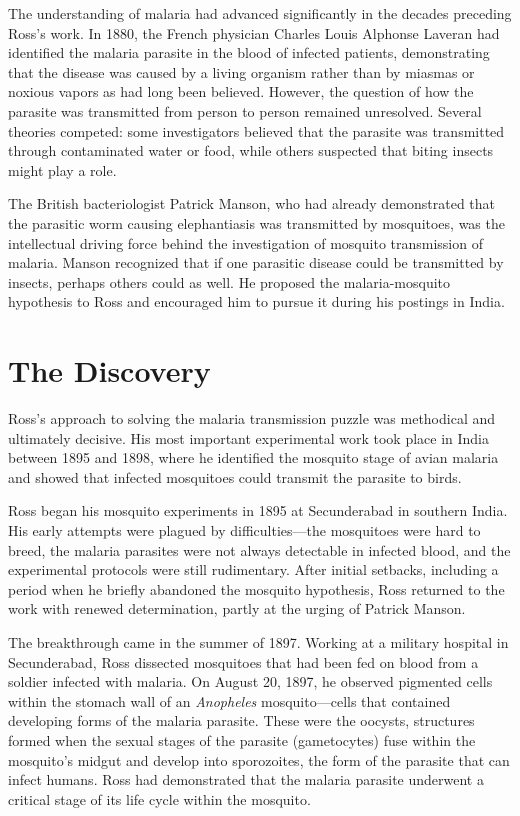 The understanding of malaria had advanced significantly in the decades preceding Ross's work. In 1880, the French physician Charles Louis Alphonse Laveran had identified the malaria parasite in the blood of infected patients, demonstrating that the disease was caused by a living organism rather than by miasmas or noxious vapors as had long been believed. However, the question of how the parasite was transmitted from person to person remained unresolved. Several theories competed: some investigators believed that the parasite was transmitted through contaminated water or food, while others suspected that biting insects might play a role.

The British bacteriologist Patrick Manson, who had already demonstrated that the parasitic worm causing elephantiasis was transmitted by mosquitoes, was the intellectual driving force behind the investigation of mosquito transmission of malaria. Manson recognized that if one parasitic disease could be transmitted by insects, perhaps others could as well. He proposed the malaria-mosquito hypothesis to Ross and encouraged him to pursue it during his postings in India.

\section{The Discovery}

Ross's approach to solving the malaria transmission puzzle was methodical and ultimately decisive. His most important experimental work took place in India between 1895 and 1898, where he identified the mosquito stage of avian malaria and showed that infected mosquitoes could transmit the parasite to birds.

Ross began his mosquito experiments in 1895 at Secunderabad in southern India. His early attempts were plagued by difficulties---the mosquitoes were hard to breed, the malaria parasites were not always detectable in infected blood, and the experimental protocols were still rudimentary. After initial setbacks, including a period when he briefly abandoned the mosquito hypothesis, Ross returned to the work with renewed determination, partly at the urging of Patrick Manson.

The breakthrough came in the summer of 1897. Working at a military hospital in Secunderabad, Ross dissected mosquitoes that had been fed on blood from a soldier infected with malaria. On August 20, 1897, he observed pigmented cells within the stomach wall of an \emph{Anopheles} mosquito---cells that contained developing forms of the malaria parasite. These were the oocysts, structures formed when the sexual stages of the parasite (gametocytes) fuse within the mosquito's midgut and develop into sporozoites, the form of the parasite that can infect humans. Ross had demonstrated that the malaria parasite underwent a critical stage of its life cycle within the mosquito.

